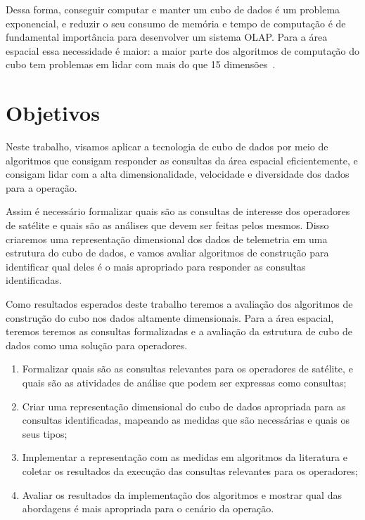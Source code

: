 Dessa forma, conseguir computar e manter um cubo de dados é um problema exponencial, e reduzir o seu consumo de memória e tempo de computação é de fundamental importância para desenvolver um sistema OLAP.
Para a área espacial essa necessidade é maior: a maior parte dos algoritmos de computação do cubo tem problemas em lidar com mais do que 15 dimensões~\cite{silva:2015:abordagensParaCubo}.

\section{Objetivos}\label{ch:intro:obj}

Neste trabalho, visamos aplicar a tecnologia de cubo de dados por meio de algoritmos que consigam responder as consultas da área espacial eficientemente, e consigam lidar com a alta dimensionalidade, velocidade e diversidade dos dados para a operação.

Assim é necessário formalizar quais são as consultas de interesse dos operadores de satélite e quais são as análises que devem ser feitas pelos mesmos.
Disso criaremos uma representação dimensional dos dados de telemetria em uma estrutura do cubo de dados, e vamos avaliar algoritmos de construção para identificar qual deles é o mais apropriado para responder as consultas identificadas.

Como resultados esperados deste trabalho teremos a avaliação dos algoritmos de construção do cubo nos dados altamente dimensionais.
Para a área espacial, teremos teremos as consultas formalizadas e a avaliação da estrutura de cubo de dados como uma solução para operadores.

\begin{enumerate}
\item Formalizar quais são as consultas relevantes para os operadores de satélite, e quais são as atividades de análise que podem ser expressas como consultas;
\item Criar uma representação dimensional do cubo de dados apropriada para as consultas identificadas, mapeando as medidas que são necessárias e quais os seus tipos;
\item Implementar a representação com as medidas em algoritmos da literatura e coletar os resultados da execução das consultas relevantes para os operadores;
\item Avaliar os resultados da implementação dos algoritmos e mostrar qual das abordagens é mais apropriada para o cenário da operação.
\end{enumerate}

